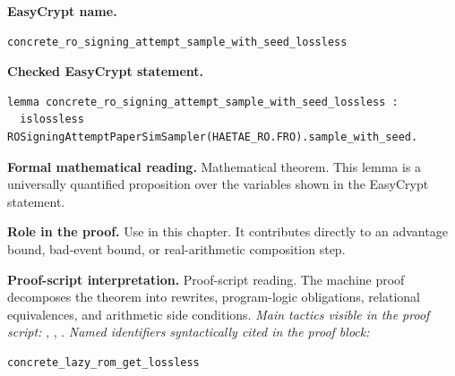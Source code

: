 \begin{formaltheorem}
\noindent\textbf{EasyCrypt name.}
\begin{lstlisting}[language=EasyCrypt,basicstyle=\ttfamily\scriptsize]
concrete_ro_signing_attempt_sample_with_seed_lossless
\end{lstlisting}
\noindent\textbf{Checked EasyCrypt statement.}
\begin{lstlisting}[language=EasyCrypt,basicstyle=\ttfamily\scriptsize]
lemma concrete_ro_signing_attempt_sample_with_seed_lossless :
  islossless ROSigningAttemptPaperSimSampler(HAETAE_RO.FRO).sample_with_seed.
\end{lstlisting}
\noindent\textbf{Formal mathematical reading.}
Mathematical theorem. This lemma is a universally quantified proposition over the variables shown in the EasyCrypt statement.

\noindent\textbf{Role in the proof.}
Use in this chapter. It contributes directly to an advantage bound, bad-event bound, or real-arithmetic composition step.

\noindent\textbf{Proof-script interpretation.}
Proof-script reading. The machine proof decomposes the theorem into rewrites, program-logic obligations, relational equivalences, and arithmetic side conditions.
\emph{Main tactics visible in the proof script:} , , .
\emph{Named identifiers syntactically cited in the proof block:}
\begin{lstlisting}[language=EasyCrypt,basicstyle=\ttfamily\scriptsize]
concrete_lazy_rom_get_lossless
\end{lstlisting}

\end{formaltheorem}

